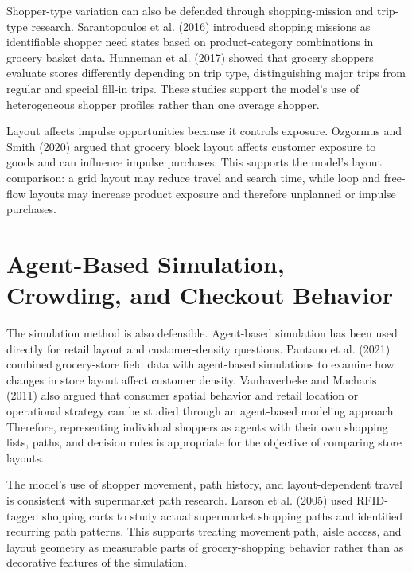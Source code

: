 \documentclass[12pt]{article}
\begin{document}
Shopper-type variation can also be defended through shopping-mission and trip-type research. Sarantopoulos et al. (2016) introduced shopping missions as identifiable shopper need states based on product-category combinations in grocery basket data. Hunneman et al. (2017) showed that grocery shoppers evaluate stores differently depending on trip type, distinguishing major trips from regular and special fill-in trips. These studies support the model's use of heterogeneous shopper profiles rather than one average shopper.

Layout affects impulse opportunities because it controls exposure. Ozgormus and Smith (2020) argued that grocery block layout affects customer exposure to goods and can influence impulse purchases. This supports the model's layout comparison: a grid layout may reduce travel and search time, while loop and free-flow layouts may increase product exposure and therefore unplanned or impulse purchases.

\section{Agent-Based Simulation, Crowding, and Checkout Behavior}

The simulation method is also defensible. Agent-based simulation has been used directly for retail layout and customer-density questions. Pantano et al. (2021) combined grocery-store field data with agent-based simulations to examine how changes in store layout affect customer density. Vanhaverbeke and Macharis (2011) also argued that consumer spatial behavior and retail location or operational strategy can be studied through an agent-based modeling approach. Therefore, representing individual shoppers as agents with their own shopping lists, paths, and decision rules is appropriate for the objective of comparing store layouts.

The model's use of shopper movement, path history, and layout-dependent travel is consistent with supermarket path research. Larson et al. (2005) used RFID-tagged shopping carts to study actual supermarket shopping paths and identified recurring path patterns. This supports treating movement path, aisle access, and layout geometry as measurable parts of grocery-shopping behavior rather than as decorative features of the simulation.
\end{document}
